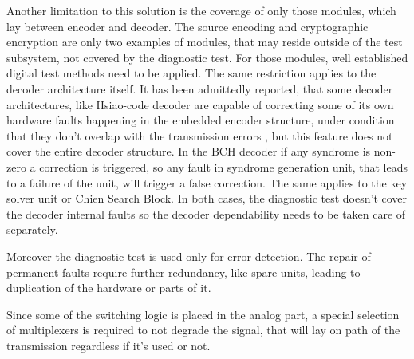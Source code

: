 Another limitation to this solution is the coverage of only those modules, which lay between encoder and decoder. The source encoding and cryptographic encryption are only two examples of modules, that may reside outside of the test subsystem, not covered by the diagnostic test. For those modules, well established digital test methods need to be applied. The same restriction applies to the decoder architecture itself. It has been admittedly reported, that some decoder architectures, like Hsiao-code decoder are capable of correcting some of its own hardware faults happening in the embedded encoder structure, under condition that they don't overlap with the transmission errors \cite{art:Dicorato}, but this feature does not cover the entire decoder structure. In the BCH decoder if any syndrome is non-zero a correction is triggered, so any fault in syndrome generation unit, that leads to a failure of the unit, will trigger a false correction. The same applies to the key solver unit or Chien Search Block. In both cases, the diagnostic test doesn't cover the decoder internal faults so the decoder dependability needs to be taken care of separately.

Moreover the diagnostic test is used only for error detection. The repair of permanent faults require further redundancy, like spare units, leading to duplication of the hardware or parts of it.

Since some of the switching logic is placed in the analog part, a special selection of multiplexers is required to not degrade the signal, that will lay on path of the transmission regardless if it's used or not.